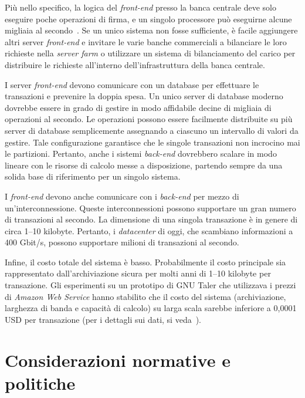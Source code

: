 \documentclass{article}
\begin{document}
Più nello specifico, la logica del \textit{front-end} presso la banca 
centrale deve solo eseguire poche operazioni di firma, e un singolo 
processore può eseguirne alcune migliaia al secondo~\cite[vedi][]{Bernstein2020}. 
Se un unico sistema non fosse sufficiente, è facile aggiungere altri 
server \textit{front-end} e invitare le varie banche commerciali a 
bilanciare le loro richieste nella \textit{server farm} o 
utilizzare un sistema di bilanciamento del carico per distribuire le 
richieste all'interno dell'infrastruttura della banca centrale.

I server \textit{front-end} devono comunicare con un database per 
effettuare le transazioni e prevenire la doppia spesa. Un unico server 
di database moderno dovrebbe essere in grado di gestire in modo 
affidabile decine di migliaia di operazioni al secondo. Le operazioni 
possono essere facilmente distribuite su più server di database 
semplicemente assegnando a ciascuno un intervallo di valori da 
gestire. Tale configurazione garantisce che le singole transazioni non 
incrocino mai le partizioni. Pertanto, anche i sistemi \textit{back-end} 
dovrebbero scalare in modo lineare con le risorse di calcolo messe a 
disposizione, partendo sempre da una solida base di riferimento per un 
singolo sistema.

I \textit{front-end} devono anche comunicare con i \textit{back-end} per 
mezzo di un'interconnessione. Queste interconnessioni possono 
supportare un gran numero di transazioni al secondo. La dimensione di 
una singola transazione è in genere di circa 1–10 kilobyte. Pertanto, 
i \textit{datacenter} di oggi, che scambiano informazioni a 400 Gbit/s, 
possono supportare milioni di transazioni al secondo.

Infine, il costo totale del sistema è basso. Probabilmente il costo
principale sia rappresentato dall'archiviazione sicura per 
molti anni di 1–10 kilobyte per transazione. Gli esperimenti su un 
prototipo di GNU Taler che utilizzava i prezzi di \textit{Amazon Web Service} 
hanno stabilito che il costo del sistema (archiviazione, larghezza di 
banda e capacità di calcolo) su larga scala sarebbe inferiore a 
0,0001 USD per transazione (per i dettagli sui dati, si veda~\citet{Dold}).


\section{Considerazioni normative e politiche}
    \label{5.-considerazioni-normative-e-politiche}
\end{document}
